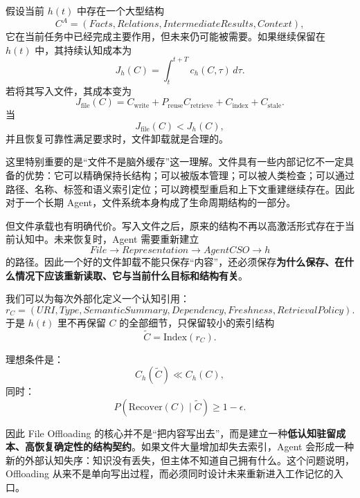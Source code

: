 假设当前 $h(t)$ 中存在一个大型结构
\begin{equation}
C^{A}
=
(
Facts,
Relations,
IntermediateResults,
Context
),
\end{equation}
它在当前任务中已经完成主要作用，但未来仍可能被需要。如果继续保留在 $h(t)$ 中，其持续认知成本为
\begin{equation}
J_h(C)
=
\int_t^{t+T}
c_h(C,\tau)\,d\tau.
\end{equation}
若将其写入文件，其成本变为
\begin{equation}
J_{\mathrm{file}}(C)
=
C_{\mathrm{write}}
+
P_{\mathrm{reuse}}C_{\mathrm{retrieve}}
+
C_{\mathrm{index}}
+
C_{\mathrm{stale}}.
\end{equation}
当
\begin{equation}
J_{\mathrm{file}}(C)
<
J_h(C),
\end{equation}
并且恢复可靠性满足要求时，文件卸载就是合理的。

这里特别重要的是“文件不是脑外缓存”这一理解。文件具有一些内部记忆不一定具备的优势：它可以精确保持长结构；可以被版本管理；可以被人类检查；可以通过路径、名称、标签和语义索引定位；可以跨模型重启和上下文重建继续存在。因此对于一个长期 Agent，文件系统本身构成了生命周期结构的一部分。

但文件承载也有明确代价。写入文件之后，原来的结构不再以高激活形式存在于当前认知中。未来恢复时，Agent 需要重新建立
\begin{equation}
File
\rightarrow
Representation
\rightarrow
AgentCSO
\rightarrow
h
\end{equation}
的路径。因此一个好的文件卸载不能只保存“内容”，还必须保存\textbf{为什么保存、在什么情况下应该重新读取、它与当前什么目标和结构有关}。

我们可以为每次外部化定义一个认知引用：
\begin{equation}
r_C
=
(
URI,
Type,
SemanticSummary,
Dependency,
Freshness,
RetrievalPolicy
).
\end{equation}
于是 $h(t)$ 里不再保留 $C$ 的全部细节，只保留较小的索引结构
\begin{equation}
\tilde C
=
\mathrm{Index}(r_C).
\end{equation}

理想条件是：
\begin{equation}
C_h(\tilde C)
\ll
C_h(C),
\end{equation}
同时：
\begin{equation}
P(\mathrm{Recover}(C)\mid \tilde C)
\geq
1-\epsilon.
\end{equation}

因此 File Offloading 的核心并不是“把内容写出去”，而是建立一种\textbf{低认知驻留成本、高恢复确定性的结构契约}。如果文件大量增加却失去索引，Agent 会形成一种新的外部认知失序：知识没有丢失，但主体不知道自己拥有什么。这个问题说明，Offloading 从来不是单向写出过程，而必须同时设计未来重新进入工作记忆的入口。

